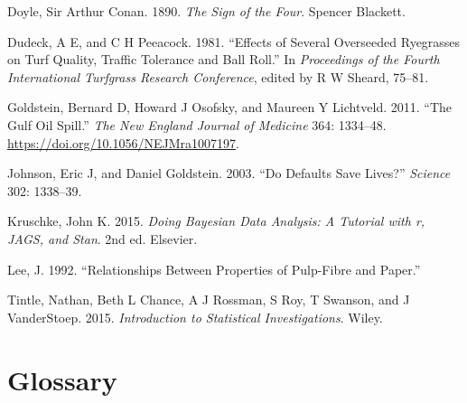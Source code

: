 \documentclass[
  letterpaper,
  DIV=11,
  numbers=noendperiod]{scrreprt}
\newlength{\cslhangindent}
\newlength{\cslentryspacingunit} %
\newenvironment{CSLReferences}[2] %
 {%
  \setlength{\parindent}{0pt}
  \ifodd #1
  \let\oldpar\par
  \def\par{\hangindent=\cslhangindent\oldpar}
  \fi
  \setlength{\parskip}{#2\cslentryspacingunit}
 }%
 {}
\theoremstyle{definition}
\theoremstyle{plain}
\theoremstyle{definition}
\theoremstyle{remark}
\begin{document}
\hypertarget{refs}{}
\begin{CSLReferences}{1}{0}
\leavevmode{}%
Doyle, Sir Arthur Conan. 1890. \emph{The Sign of the Four}. Spencer
Blackett.

\leavevmode{}%
Dudeck, A E, and C H Peeacock. 1981. {``Effects of Several Overseeded
Ryegrasses on Turf Quality, Traffic Tolerance and Ball Roll.''} In
\emph{Proceedings of the Fourth International Turfgrass Research
Conference}, edited by R W Sheard, 75--81.

\leavevmode{}%
Goldstein, Bernard D, Howard J Osofsky, and Maureen Y Lichtveld. 2011.
{``The Gulf Oil Spill.''} \emph{The New England Journal of Medicine}
364: 1334--48. \url{https://doi.org/10.1056/NEJMra1007197}.

\leavevmode{}%
Johnson, Eric J, and Daniel Goldstein. 2003. {``Do Defaults Save
Lives?''} \emph{Science} 302: 1338--39.

\leavevmode{}%
Kruschke, John K. 2015. \emph{Doing Bayesian Data Analysis: A Tutorial
with r, JAGS, and Stan}. 2nd ed. Elsevier.

\leavevmode{}%
Lee, J. 1992. {``Relationships Between Properties of Pulp-Fibre and
Paper.''}

\leavevmode{}%
Tintle, Nathan, Beth L Chance, A J Rossman, S Roy, T Swanson, and J
VanderStoep. 2015. \emph{Introduction to Statistical Investigations}.
Wiley.

\end{CSLReferences}

\cleardoublepage
{}
{}
\appendix

\hypertarget{glossary}{%
\chapter{Glossary}\label{glossary}}

\providecommand{\norm}[1]{\lVert#1\rVert}
\providecommand{\abs}[1]{\lvert#1\rvert}
\providecommand{\iid}{\stackrel{\text{IID}}{\sim}}
\providecommand{\ind}{\stackrel{\text{Ind}}{\sim}}

\providecommand{\bm}[1]{\mathbf{#1}}
\providecommand{\bs}[1]{\boldsymbol{#1}}
\providecommand{\bbeta}{\bs{\beta}}
\end{document}
